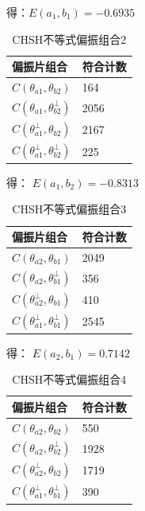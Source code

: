 \documentclass[a4paper,UTF8]{ctexart}
\begin{document}
得：$E(a_1,b_1) = -0.6935$

\begin{table}[H]
    \centering
    \caption{CHSH不等式偏振组合2}
    \begin{tabular}{|l|l|}
    \hline
        \textbf{偏振片组合} & \textbf{符合计数} \\ \hline
        $C(\theta_{a1},\theta_{b2})$ & 164 \\ \hline
        $C(\theta_{a1},\theta_{b2}^{\bot})$ & 2056 \\ \hline
        $C(\theta_{a1}^{\bot},\theta_{b2})$ & 2167 \\ \hline
        $C(\theta_{a1}^{\bot},\theta_{b2}^{\bot})$ & 225 \\ \hline
    \end{tabular}
\end{table}

得： $E(a_1,b_2) = -0.8313$

\begin{table}[H]
    \centering
    \caption{CHSH不等式偏振组合3}
    \begin{tabular}{|l|l|}
    \hline
        \textbf{偏振片组合} & \textbf{符合计数} \\ \hline
        $C(\theta_{a2},\theta_{b1})$ & 2049 \\ \hline
        $C(\theta_{a2},\theta_{b1}^{\bot})$ & 356 \\ \hline
        $C(\theta_{a2}^{\bot},\theta_{b1})$ & 410 \\ \hline
        $C(\theta_{a1}^{\bot},\theta_{b1}^{\bot})$ & 2545 \\ \hline
    \end{tabular}
\end{table}

得： $E(a_2,b_1) = 0.7142$

\begin{table}[H]
    \centering
    \caption{CHSH不等式偏振组合4}
    \begin{tabular}{|l|l|}
    \hline
        \textbf{偏振片组合} & \textbf{符合计数} \\ \hline
        $C(\theta_{a2},\theta_{b2})$ & 550 \\ \hline
        $C(\theta_{a2},\theta_{b2}^{\bot})$ & 1928 \\ \hline
        $C(\theta_{a2}^{\bot},\theta_{b2})$ & 1719 \\ \hline
        $C(\theta_{a1}^{\bot},\theta_{b1}^{\bot})$ & 390 \\ \hline
    \end{tabular}
\end{table}
\end{document}
